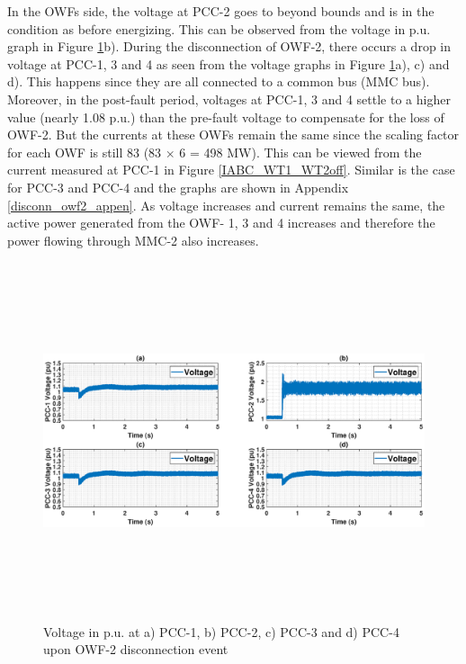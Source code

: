 In the \gls{OWF}s side, the voltage at \gls{PCC}-2 goes to beyond bounds and is in the condition as before energizing. This can be observed from the voltage in p.u. graph in Figure \ref{VACP_WT134_WT2off}b). During the disconnection of \gls{OWF}-2, there occurs a drop in voltage at \gls{PCC}-1, 3 and 4 as seen from the voltage graphs in Figure \ref{VACP_WT134_WT2off}a), c) and d). This happens since they are all connected to a common bus (\gls{MMC} bus). Moreover, in the post-fault period, voltages at \gls{PCC}-1, 3 and 4 settle to a higher value (nearly 1.08 p.u.) than the pre-fault voltage to compensate for the loss of \gls{OWF}-2. But the currents at these \gls{OWF}s remain the same since the scaling factor for each \gls{OWF} is still 83 (83 $\times$ 6 = 498 MW). This can be viewed from the current measured at \gls{PCC}-1 in Figure \ref{IABC_WT1_WT2off}. Similar is the case for \gls{PCC}-3 and \gls{PCC}-4 and the graphs are shown in Appendix \ref{disconn_owf2_appen}. As voltage increases and current remains the same, the active power generated from the \gls{OWF}- 1, 3 and 4 increases and therefore the power flowing through \gls{MMC}-2 also increases.

\begin{figure}[H]
\hspace*{-1.7cm}
    \includegraphics[height = 10.5cm,width = 20.5cm]{Diagrams/Chapter_5/VACP_WT1234_WT2off.eps}
    \caption{Voltage in p.u. at a) PCC-1, b) PCC-2, c) PCC-3 and d) PCC-4 upon OWF-2 disconnection event}
    \label{VACP_WT134_WT2off}
\end{figure}

